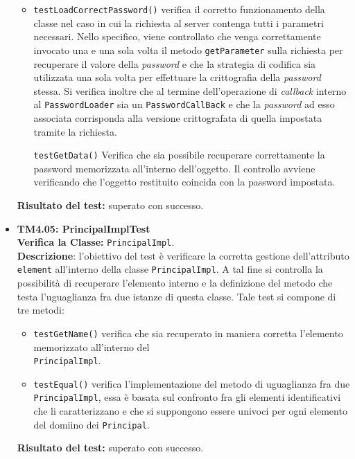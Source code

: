 \begin{itemize}
\begin{itemize}
\item \texttt{testLoadCorrectPassword()} verifica il corretto funzionamento della classe nel caso in cui la richiesta al server contenga tutti i parametri necessari. Nello specifico, viene controllato che venga correttamente invocato una e una sola volta il metodo \texttt{getParameter} sulla richiesta per recuperare il valore della \textit{password} e che la strategia di codifica sia utilizzata una sola volta per effettuare la crittografia della \textit{password} stessa. Si verifica inoltre che al termine dell'operazione di \textit{callback} interno al \texttt{PasswordLoader} sia un \texttt{PasswordCallBack} e che la \textit{password} ad esso associata corrisponda alla versione crittografata di quella impostata tramite la richiesta.

\texttt{testGetData()} Verifica che sia possibile recuperare correttamente la password memorizzata all'interno dell'oggetto.
Il controllo avviene verificando che l'oggetto restituito coincida con la password impostata.
 
\end{itemize}
\textbf{Risultato del test:} superato con successo.


\item \textbf{TM4.05: PrincipalImplTest}\\
\textbf{Verifica la Classe:} \texttt{PrincipalImpl}.\\
\textbf{Descrizione}: l'obiettivo del test è verificare la corretta gestione dell'attributo \texttt{element} all'interno della classe \texttt{PrincipalImpl}. A tal fine si controlla la possibilità di recuperare l'elemento interno e la definizione del metodo che testa l'uguaglianza fra due istanze di questa classe.
Tale test si compone di tre metodi:
\begin{itemize}
\item \texttt{testGetName()} verifica che sia recuperato in maniera corretta l'elemento memorizzato all'interno del\\ \texttt{PrincipalImpl}.

\item \texttt{testEqual()} verifica l'implementazione del metodo di uguaglianza fra due \\ \texttt{PrincipalImpl}, essa è basata sul confronto fra gli elementi identificativi che li caratterizzano e che si suppongono essere univoci per ogni elemento del domiino dei \texttt{Principal}.
\end{itemize}
\textbf{Risultato del test:} superato con successo.

\end{itemize}

